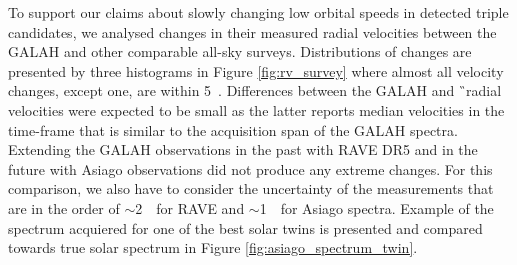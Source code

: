 \begin{figure}
		
\end{figure}

To support our claims about slowly changing low orbital speeds in detected triple candidates, we analysed changes in their measured radial velocities between the GALAH and other comparable all-sky surveys. Distributions of changes are presented by three histograms in Figure \ref{fig:rv_survey} where almost all velocity changes, except one, are within 5~\kms. Differences between the GALAH and \G\ radial velocities were expected to be small as the latter reports median velocities in the time-frame that is similar to the acquisition span of the GALAH spectra. Extending the GALAH observations in the past with RAVE DR5 \cite{2017AJ....153...75K} and in the future with Asiago observations did not produce any extreme changes. For this comparison, we also have to consider the uncertainty of the measurements that are in the order of $\sim$2~\kms\ for RAVE and $\sim$1~\kms\ for Asiago spectra. Example of the spectrum acquiered for one of the best solar twins is presented and compared towards true solar spectrum in Figure \ref{fig:asiago_spectrum_twin}.

